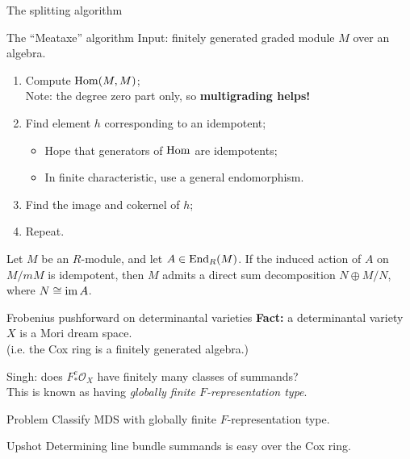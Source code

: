 \documentclass[beamer]{paper}
\def\OO{\mathcal{O}}
\begin{document}
\begin{frame}{The splitting algorithm}
  \begin{alertblock}{The ``Meataxe'' algorithm}
    Input: finitely generated graded module $M$ over an algebra.
    \begin{enumerate}
    \item Compute $\operatorname{Hom}(M, M)$; \\ %
      Note: the degree zero part only, so \textbf{multigrading helps!} %
    \item Find element $h$ corresponding to an idempotent; \\ %
      \begin{itemize}
      \item Hope that generators of $\operatorname{Hom}$ are idempotents; %
      \item In finite characteristic, use a general endomorphism. %
      \end{itemize}
    \item Find the image and cokernel of $h$;
    \item Repeat.
    \end{enumerate}
  \end{alertblock}

  \vfill
  \begin{lemma}
    Let $M$ be an $R$-module, and let $A\in\operatorname{End}_R(M)$. If the induced action of $A$ on $M/mM$ is idempotent, then $M$ admits a direct sum decomposition $N\oplus M/N$, where $N\cong \operatorname{im} A$.
  \end{lemma}

\end{frame}


\begin{frame}[t]{Frobenius pushforward on determinantal varieties}
  \textbf{Fact:} a determinantal variety $X$ is a Mori dream space. \\
  \hfill (i.e. the Cox ring is a finitely generated algebra.)

  \vfill
  Singh: does $F^e_*\OO_X$ have finitely many classes of summands? \\
  This is known as having \emph{globally finite $F$-representation type}.

  \begin{block}{Problem}
    Classify MDS with globally finite $F$-representation type.
  \end{block}

  \begin{alertblock}{Upshot}
    Determining line bundle summands is easy over the Cox ring.
  \end{alertblock}

  \vfill
\end{frame}
\end{document}
